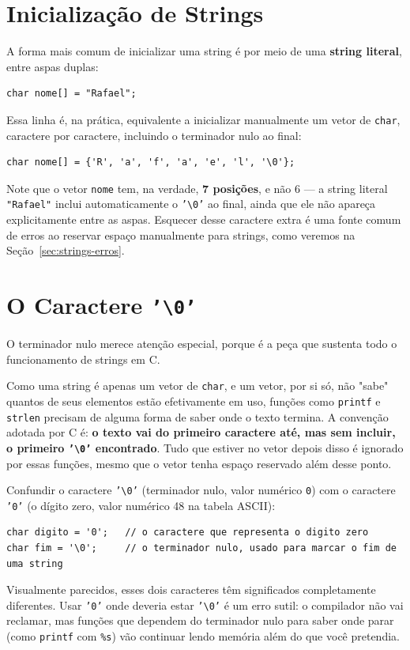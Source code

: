 \documentclass[12pt,a4paper,oneside]{extreport}
\begin{document}
\section{Inicialização de Strings}

A forma mais comum de inicializar uma string é por meio de uma \textbf{string literal}, entre aspas duplas:

\begin{lstlisting}
char nome[] = "Rafael";
\end{lstlisting}

Essa linha é, na prática, equivalente a inicializar manualmente um vetor de \texttt{char}, caractere por caractere, incluindo o terminador nulo ao final:

\begin{lstlisting}
char nome[] = {'R', 'a', 'f', 'a', 'e', 'l', '\0'};
\end{lstlisting}

Note que o vetor \texttt{nome} tem, na verdade, \textbf{7 posições}, e não 6 — a string literal \texttt{"Rafael"} inclui automaticamente o \texttt{'\textbackslash 0'} ao final, ainda que ele não apareça explicitamente entre as aspas. Esquecer desse caractere extra é uma fonte comum de erros ao reservar espaço manualmente para strings, como veremos na Seção~\ref{sec:strings-erros}.

\section{O Caractere \texttt{'\textbackslash 0'}}

O terminador nulo merece atenção especial, porque é a peça que sustenta todo o funcionamento de strings em C.

Como uma string é apenas um vetor de \texttt{char}, e um vetor, por si só, não "sabe" quantos de seus elementos estão efetivamente em uso, funções como \texttt{printf} e \texttt{strlen} precisam de alguma forma de saber onde o texto termina. A convenção adotada por C é: \textbf{o texto vai do primeiro caractere até, mas sem incluir, o primeiro \texttt{'\textbackslash 0'} encontrado}. Tudo que estiver no vetor depois disso é ignorado por essas funções, mesmo que o vetor tenha espaço reservado além desse ponto.

\begin{errocomum}
Confundir o caractere \texttt{'\textbackslash 0'} (terminador nulo, valor numérico \texttt{0}) com o caractere \texttt{'0'} (o dígito zero, valor numérico 48 na tabela ASCII):
\begin{lstlisting}
char digito = '0';   // o caractere que representa o digito zero
char fim = '\0';     // o terminador nulo, usado para marcar o fim de uma string
\end{lstlisting}
Visualmente parecidos, esses dois caracteres têm significados completamente diferentes. Usar \texttt{'0'} onde deveria estar \texttt{'\textbackslash 0'} é um erro sutil: o compilador não vai reclamar, mas funções que dependem do terminador nulo para saber onde parar (como \texttt{printf} com \texttt{\%s}) vão continuar lendo memória além do que você pretendia.
\end{errocomum}
\end{document}
